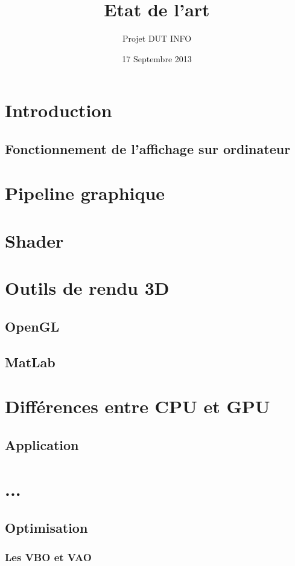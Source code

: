 \documentclass[12pt,a4paper,openany]{report}
\title{Etat de l'art}
\author{Projet DUT INFO}
\date{17 Septembre 2013}
\begin{document}
\maketitle

\hypertarget{tableofcontents}{} %
\tableofcontents

\part{Introduction}

\chapter{Fonctionnement de l'affichage sur ordinateur}


%

\part{Pipeline graphique}


\part{Shader}


\part{Outils de rendu 3D}

\chapter{OpenGL}


\chapter{MatLab}


\part{Différences entre CPU et GPU}
\chapter{Application}


\part{...}
\chapter{Optimisation}
\section{Les VBO et VAO}


\newpage
\end{document}
